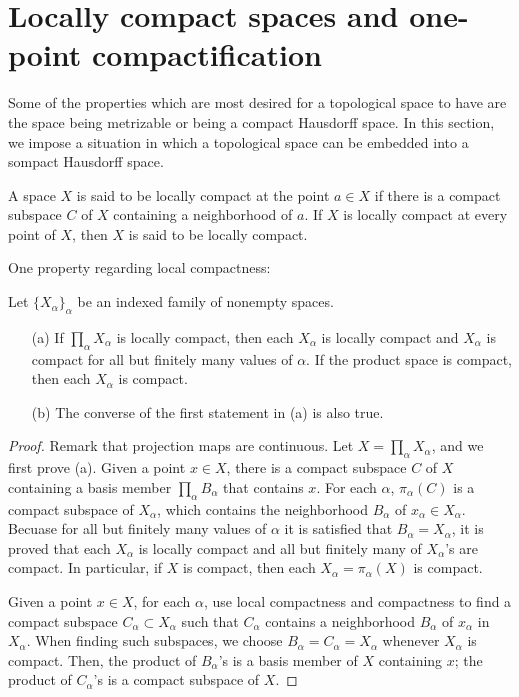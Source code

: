 \section{Locally compact spaces and one-point compactification}

Some of the properties which are most desired for a topological space to have are the space being metrizable or being a compact Hausdorff space.
In this section, we impose a situation in which a topological space can be embedded into a sompact Hausdorff space.

\begin{defi}
    A space $X$ is said to be locally compact at the point $a\in X$ if there is a compact subspace $C$ of $X$ containing a neighborhood of $a$.
    If $X$ is locally compact at every point of $X$, then $X$ is said to be locally compact.
\end{defi}

One property regarding local compactness:
\begin{prop}
    Let $\{X_\alpha\}_\alpha$ be an indexed family of nonempty spaces.
    \begin{enumerate}
        \item[(a)] If $\prod_\alpha X_\alpha$ is locally compact, then each $X_\alpha$ is locally compact and $X_\alpha$ is compact for all but finitely many values of $\alpha$.
        If the product space is compact, then each $X_\alpha$ is compact.
        \item[(b)] The converse of the first statement in (a) is also true.
    \end{enumerate}
\end{prop}
\begin{proof}
    Remark that projection maps are continuous.
    Let $X=\prod_\alpha X_\alpha$, and we first prove (a).
    Given a point $x\in X$, there is a compact subspace $C$ of $X$ containing a basis member $\prod_\alpha B_\alpha$ that contains $x$.
    For each $\alpha$, $\pi_\alpha(C)$ is a compact subspace of $X_\alpha$, which contains the neighborhood $B_\alpha$ of $x_\alpha\in X_\alpha$.
    Becuase for all but finitely many values of $\alpha$ it is satisfied that $B_\alpha=X_\alpha$, it is proved that each $X_\alpha$ is locally compact and all but finitely many of $X_\alpha$'s are compact.
    In particular, if $X$ is compact, then each $X_\alpha=\pi_\alpha(X)$ is compact.
    
    Given a point $x\in X$, for each $\alpha$, use local compactness and compactness to find a compact subspace $C_\alpha\subset X_\alpha$ such that $C_\alpha$ contains a neighborhood $B_\alpha$ of $x_\alpha$ in $X_\alpha$.
    When finding such subspaces, we choose $B_\alpha=C_\alpha=X_\alpha$ whenever $X_\alpha$ is compact.
    Then, the product of $B_\alpha$'s is a basis member of $X$ containing $x$; the product of $C_\alpha$'s is a compact subspace of $X$.
\end{proof}

